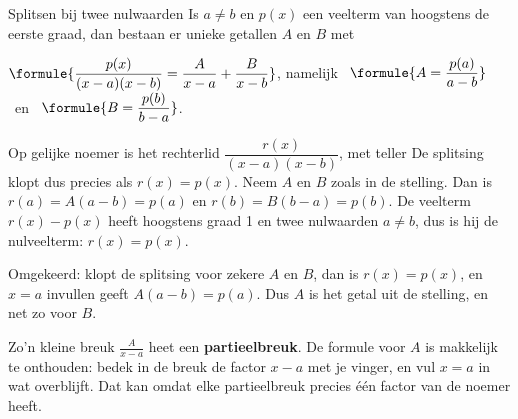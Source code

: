 \begin{theorie}
\begin{stelling}{Splitsen bij twee nulwaarden}
Is $a \neq b$ en $p(x)$ een veelterm van hoogstens de eerste graad, dan bestaan er unieke getallen $A$ en $B$ met

\vspace{1mm}
\qquad $\formule{\dfrac{p(x)}{(x - a)(x - b)} = \dfrac{A}{x - a} + \dfrac{B}{x - b}}$, \qquad namelijk \ $\formule{A = \dfrac{p(a)}{a - b}}$ \ en \ $\formule{B = \dfrac{p(b)}{b - a}}$.
\end{stelling}

\begin{bewijs}
Op gelijke noemer is het rechterlid $\dfrac{r(x)}{(x - a)(x - b)}$, met teller
De splitsing klopt dus precies als $r(x) = p(x)$. Neem $A$ en $B$ zoals in de stelling. Dan is $r(a) = A(a - b) = p(a)$ en $r(b) = B(b - a) = p(b)$. De veelterm $r(x) - p(x)$ heeft hoogstens graad 1 en twee nulwaarden $a \neq b$, dus is hij de nulveelterm: $r(x) = p(x)$.

Omgekeerd: klopt de splitsing voor zekere $A$ en $B$, dan is $r(x) = p(x)$, en $x = a$ invullen geeft $A(a - b) = p(a)$. Dus $A$ is het getal uit de stelling, en net zo voor $B$.
\end{bewijs}
\end{theorie}

Zo'n kleine breuk $\tfrac{A}{x - a}$ heet een \textbf{partieelbreuk}. De formule voor $A$ is makkelijk te onthouden: bedek in de breuk de factor $x - a$ met je vinger, en vul $x = a$ in wat overblijft. Dat kan omdat elke partieelbreuk precies één factor van de noemer heeft.

